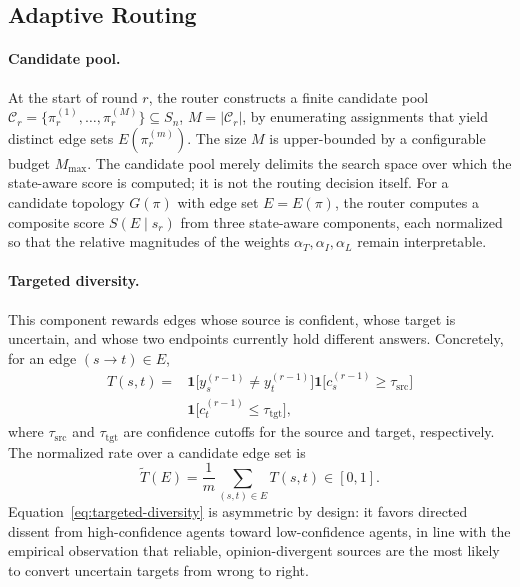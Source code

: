 \subsection{Adaptive Routing}
\label{sec:method:routing}

\paragraph{Candidate pool.}
At the start of round $r$, the router constructs a finite candidate pool
\(    \mathcal{C}_r=\{\pi_r^{(1)},\ldots,\pi_r^{(M)}\}\subseteq S_n\), \(M=|\mathcal{C}_r|\),
by enumerating assignments that yield distinct edge sets $E(\pi_r^{(m)})$. The size $M$ is upper-bounded by a configurable budget $M_{\max}$. The candidate pool merely delimits the search space over which the state-aware score is computed; it is not the routing decision itself. 
For a candidate topology $G(\pi)$ with edge set $E=E(\pi)$, the router computes a composite score $S(E\mid s_r)$ from three state-aware components, each normalized so that the relative magnitudes of the weights $\alpha_T,\alpha_I,\alpha_L$ remain interpretable.
 
\paragraph{Targeted diversity.}
This component rewards edges whose source is confident, whose target is uncertain, and whose two endpoints currently hold different answers. Concretely, for an edge $(s\!\to\!t)\in E$,
\begin{align}
    T(s,t)=
    & \mathbf{1}\big[y_s^{(r-1)}\!\neq\! y_t^{(r-1)}\big]
    \mathbf{1}\big[c_s^{(r-1)}\!\geq\!\tau_{\mathrm{src}}\big]\nonumber\\
    &
    \mathbf{1}\big[c_t^{(r-1)}\!\leq\!\tau_{\mathrm{tgt}}\big],
\label{eq:targeted-diversity}
\end{align}
where $\tau_{\mathrm{src}}$ and $\tau_{\mathrm{tgt}}$ are confidence cutoffs for the source and target, respectively. The normalized rate over a candidate edge set is
\begin{equation}
    \widetilde T(E)
=
\frac{1}{m}
\sum_{(s,t)\in E} T(s,t)
\in[0,1].
    \label{eq:targeted-diversity-rate}
\end{equation}
Equation~\eqref{eq:targeted-diversity} is asymmetric by design: it favors directed dissent from high-confidence agents toward low-confidence agents, in line with the empirical observation that reliable, opinion-divergent sources are the most likely to convert uncertain targets from wrong to right.

